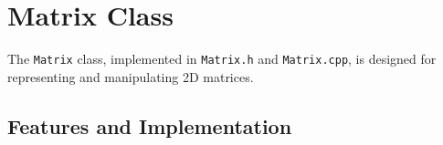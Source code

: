 \section{Matrix Class}
\label{sec:matrix_class}

The \texttt{Matrix} class, implemented in \texttt{Matrix.h} and \texttt{Matrix.cpp}, is designed for representing and manipulating 2D matrices.

\begin{figure}

\end{figure}

\subsection{Features and Implementation}
